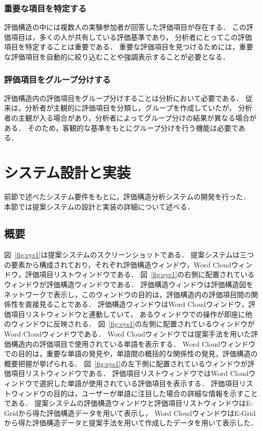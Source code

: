 \documentclass[syuuron]{kuee}
\begin{document}
		\subsubsection{重要な項目を特定する}
			評価構造の中には複数人の実験参加者が回答した評価項目が存在する．
			この評価項目は，多くの人が共有している評価基準であり，
			分析者にとってこの評価項目を特定することは重要である．
			重要な評価項目を見つけるためには，重要な評価項目を自動的に絞り込むことや強調表示することが必要となる．
		\subsubsection{評価項目をグループ分けする}%
			評価構造内の評価項目をグループ分けすることは分析において必要である．
			従来は，分析者が主観的に評価項目を分類し，グループを作成していたが，
			分析者の主観が入る場合があり，分析者によってグループ分けの結果が異なる場合がある．
			そのため，客観的な基準をもとにグループ分けを行う機能は必要である．
	\section{システム設計と実装}
		前節で述べたシステム要件をもとに，評価構造分析システムの開発を行った．
		本節では提案システムの設計と実装の詳細について述べる．
		\subsection{概要}
			図~\ref{fig:sys1}は提案システムのスクリーンショットである．
			提案システムは三つの要素から構成されており，それぞれ評価構造ウィンドウ，Word Cloudウィンドウ，評価項目リストウィンドウである．
			図~\ref{fig:sys1}の右側に配置されているウィンドウが評価構造ウィンドウである．
			評価構造ウィンドウは評価構造図をネットワークで表示し，このウィンドウの目的は，評価構造内の評価項目間の関係性を直接見ることである．
			評価構造ウィンドウはWord Cloudウィンドウ，評価項目リストウィンドウと連動していて，
			あるウィンドウでの操作が即座に他のウィンドウに反映される．
			図~\ref{fig:sys1}の左側に配置されているウィンドウがWord Cloudウィンドウである．
			Word Cloudウィンドウでは提案手法を用いた評価構造内の評価項目で使用されている単語を表示する．
			Word Cloudウィンドウでの目的は，重要な単語の発見や，単語間の概括的な関係性の発見，評価構造の概要把握が挙げられる．
			図~\ref{fig:sys1}の左下側に配置されているウィンドウが評価項目リストウィンドウである．
			評価項目リストウィンドウではWord Cloudウィンドウで選択した単語が使用されている評価項目を表示する．
			評価項目リストウィンドウの目的は，ユーザーが単語に注目した場合の詳細な情報を示すことである．
			提案システムの評価構造ウィンドウと評価項目リストウィンドウはE-Gridから得た評価構造データを用いて表示し，
			Word CloudウィンドウはE-Gridから得た評価構造データと提案手法を用いて作成したデータを用いて表示した．
			
\end{document}

